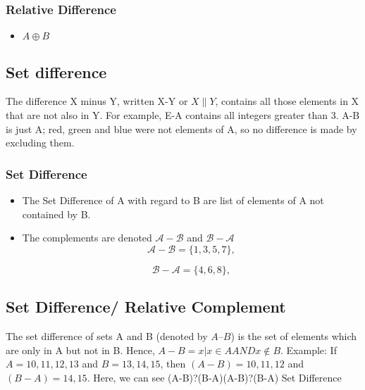 \documentclass[11pt,a4paper,titlepage,oneside,openany]{article}
\numberwithin{equation}{section}
\numberwithin{algorithm}{section}
\numberwithin{figure}{section}
\numberwithin{table}{section}
\begin{document}
\subsubsection*{Relative Difference}
\begin{itemize}
\item $ A \oplus B$
\end{itemize}


\subsection{Set difference}

The difference X minus Y, written X-Y or $X\|Y$, contains all those elements in X that are not also in Y. For example, E-A contains all integers greater than 3. 
A-B is just A; red, green and blue were not elements of A, so no difference is made by excluding them.


\subsubsection*{Set Difference}
\begin{itemize}

\item The Set Difference of A with regard to B are list of elements of A not contained by B.

\item The complements are denoted $\mathcal{A-B}$ and $\mathcal{B-A}$
\[ \mathcal{A-B} = \{1,3,5,7\}, \]

\[ \mathcal{B-A} = \{4,6,8\}, \]
\end{itemize}

\subsection{Set Difference/ Relative Complement}
The set difference of sets A and B (denoted by $A–B$) is the set of elements which are only in A but not in B. Hence, $A-B={x|x \in A AND x \notin B}$.
Example: If $A={10,11,12,13}$ and $B={13,14,15}$, then $(A-B)={10,11,12}$ and $(B-A)={14,15}$. Here, we can see (A-B)?(B-A)(A-B)?(B-A) Set Difference
\end{document}

